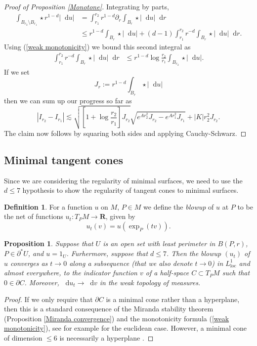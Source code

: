 \documentclass[reqno,11pt]{amsart}
\newcommand{\RR}{\mathbf{R}}
\newcommand*\dif{\mathop{}\!\mathrm{d}}
\newcommand{\dfn}[1]{\emph{#1}\index{#1}}
\newcommand{\loc}{\mathrm{loc}}
\newtheorem{proposition}[theorem]{Proposition}
\theoremstyle{definition}
\newtheorem{definition}[theorem]{Definition}
\numberwithin{equation}{section}
\begin{document}
\begin{proof}[Proof of Proposition \ref{Monotone}]
Integrating by parts,
\begin{align*}
\int_{B_{r_2} \setminus B_{r_1}} \star r^{1 - d} |\dif u| &= \int_{r_1}^{r_2} r^{1 - d} \partial_r \int_{B_r} \star |\dif u| \dif r \\
&\leq r^{1 - d} \int_{B_r} \star |\dif u| + (d - 1) \int_{r_1}^{r_2} r^{-d} \int_{B_r} \star |\dif u| \dif r.
\end{align*}
Using (\ref{weak monotonicity}) we bound this second integral as
\begin{align*}
\int_{r_1}^{r_2} r^{-d} \int_{B_r} \star |\dif u| \dif r &\leq r^{1 - d} \log \frac{r_2}{r_1} \int_{B_{r_2}} \star |\dif u|.
\end{align*}
If we set
$$J_r := r^{1 - d} \int_{B_r} \star |\dif u|$$
then we can sum up our progress so far as
$$|I_{r_2} - I_{r_1}| \lesssim \sqrt{\left[1 + \log \frac{r_2}{r_1}\right] J_{r_2}} \sqrt{e^{Ar_2^2} J_{r_2} - e^{Ar_1^2} J_{r_1}} + |K|r_2^2 J_{r_2}.$$
The claim now follows by squaring both sides and applying Cauchy-Schwarz.
\end{proof}

\subsection{Minimal tangent cones}
Since we are considering the regularity of minimal surfaces, we need to use the $d \leq 7$ hypothesis to show the regularity of tangent cones to minimal surfaces.

\begin{definition}
    For a function $u$ on $M$, $P \in M$ we define the \dfn{blowup} of $u$ at $P$ to be the net of functions $u_t: T_PM \to \RR$, given by
    $$u_t(v) = u\left(\exp_P(tv)\right).$$
\end{definition}

\begin{proposition}\label{blowup theorem}
Suppose that $U$ is an open set with least perimeter in $B(P, r)$, $P \in \partial^* U$, and $u = 1_U$.
Furhermore, suppose that $d \leq 7$.
Then the blowup $(u_t)$ of $u$ converges as $t \to 0$ along a subsequence (that we also denote $t \to 0$) in $L^1_\loc$ and almost everywhere, to the indicator function $v$ of a half-space $C \subset T_PM$ such that $0 \in \partial C$.
Moreover, $\dif u_t \to \dif v$ in the weak topology of measures.
\end{proposition}
\begin{proof}
If we only require that $\partial C$ is a minimal cone rather than a hyperplane, then this is a standard consequence of the Miranda stability theorem (Proposition \ref{Miranda convergence}) and the monotonicity formula (\ref{weak monotonicity}), see for example \cite[Theorem 9.3]{Giusti77} for the euclidean case.
However, a minimal cone of dimension $\leq 6$ is necessarily a hyperplane \cite[Theorem 9.10 and Theorem 10.10]{Giusti77}.
\end{proof}
\end{document}
